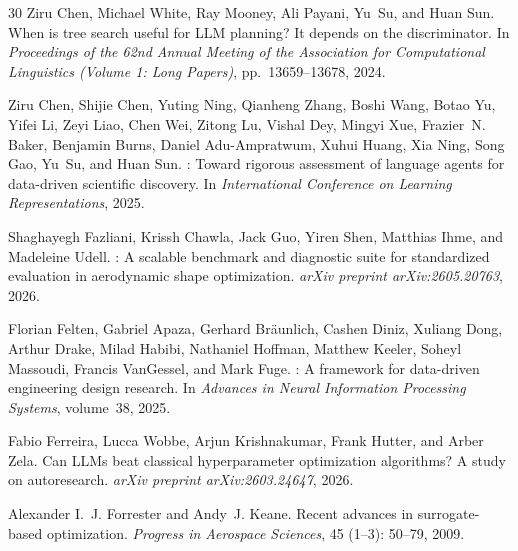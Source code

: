 \documentclass{article} %
\begin{document}
\begin{thebibliography}{30}
Ziru Chen, Michael White, Ray Mooney, Ali Payani, Yu~Su, and Huan Sun.
\newblock When is tree search useful for {LLM} planning? {I}t depends on the discriminator.
\newblock In \emph{Proceedings of the 62nd Annual Meeting of the Association for Computational Linguistics (Volume 1: Long Papers)}, pp.\  13659--13678, 2024.

Ziru Chen, Shijie Chen, Yuting Ning, Qianheng Zhang, Boshi Wang, Botao Yu, Yifei Li, Zeyi Liao, Chen Wei, Zitong Lu, Vishal Dey, Mingyi Xue, Frazier~N. Baker, Benjamin Burns, Daniel Adu-Ampratwum, Xuhui Huang, Xia Ning, Song Gao, Yu~Su, and Huan Sun.
: Toward rigorous assessment of language agents for data-driven scientific discovery.
\newblock In \emph{International Conference on Learning Representations}, 2025.

Shaghayegh Fazliani, Krissh Chawla, Jack Guo, Yiren Shen, Matthias Ihme, and Madeleine Udell.
: A scalable benchmark and diagnostic suite for standardized evaluation in aerodynamic shape optimization.
\newblock \emph{arXiv preprint arXiv:2605.20763}, 2026.

Florian Felten, Gabriel Apaza, Gerhard Br{\"a}unlich, Cashen Diniz, Xuliang Dong, Arthur Drake, Milad Habibi, Nathaniel Hoffman, Matthew Keeler, Soheyl Massoudi, Francis VanGessel, and Mark Fuge.
: A framework for data-driven engineering design research.
\newblock In \emph{Advances in Neural Information Processing Systems}, volume~38, 2025.

Fabio Ferreira, Lucca Wobbe, Arjun Krishnakumar, Frank Hutter, and Arber Zela.
\newblock Can {LLMs} beat classical hyperparameter optimization algorithms? {A} study on autoresearch.
\newblock \emph{arXiv preprint arXiv:2603.24647}, 2026.

Alexander I.~J. Forrester and Andy~J. Keane.
\newblock Recent advances in surrogate-based optimization.
\newblock \emph{Progress in Aerospace Sciences}, 45 (1--3): 50--79, 2009.


\end{thebibliography}
\end{document}
